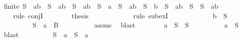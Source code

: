 \begin{isabellebody}
\ {\isachardoublequoteopen}finite\ {\isacharparenleft}S\ {\isacharminus}\ {\isacharbraceleft}a{\isacharcomma}b{\isacharbraceright}{\isacharparenright}\ {\isasymand}\ {\isacharparenleft}S\ {\isacharequal}\ {\isacharbraceleft}a{\isacharcomma}b{\isacharbraceright}\ {\isasymunion}\ {\isacharparenleft}S\ {\isacharminus}\ {\isacharbraceleft}a{\isacharcomma}b{\isacharbraceright}{\isacharparenright}\ {\isasymor}\ S\ {\isacharequal}\ {\isacharbraceleft}a{\isacharbraceright}\ {\isasymunion}\ {\isacharparenleft}S\ {\isacharminus}\ {\isacharbraceleft}a{\isacharcomma}b{\isacharbraceright}{\isacharparenright}\ {\isasymor}\ S\ {\isacharequal}\ {\isacharbraceleft}b{\isacharbraceright}\ {\isasymunion}\ {\isacharparenleft}S\ {\isacharminus}\ {\isacharbraceleft}a{\isacharcomma}b{\isacharbraceright}{\isacharparenright}\ {\isasymor}\ S\ {\isacharequal}\ {\isacharparenleft}S\ {\isacharminus}\ {\isacharbraceleft}a{\isacharcomma}b{\isacharbraceright}{\isacharparenright}{\isacharparenright}{\isachardoublequoteclose}\isanewline
\ \ \ \ \ \ \ \ \isamarkupfalse%
\ {}\ \isamarkupfalse%
\ {\isacharparenleft}rule\ conjI{\isacharparenright}\isanewline
\ \ \ \ \ \ \isamarkupfalse%
\ {\isacharquery}thesis\isanewline
\ \ \ \ \ \ \ \ \isamarkupfalse%
\ {}\ \isamarkupfalse%
\ {\isacharparenleft}rule\ subexI{\isacharparenright}\isanewline
\ \ \ \ \isamarkupfalse%
\isanewline
\ \ \ \ \ \ \isamarkupfalse%
\ {\isachardoublequoteopen}b\ {\isasymnotin}\ S{\isachardoublequoteclose}\isanewline
\ \ \ \ \ \ \isamarkupfalse%
\ \isamarkupfalse%
\ {}{\isacharcolon}{\isachardoublequoteopen}S\ {\isacharminus}\ {\isacharbraceleft}a{\isacharbraceright}\ {\isasymsubseteq}\ B{\isachardoublequoteclose}\isanewline
\ \ \ \ \ \ \ \ \isamarkupfalse%
\ assms{\isacharparenleft}{}{\isacharparenright}\ \isamarkupfalse%
\ blast\isanewline
\ \ \ \ \ \ \isamarkupfalse%
\ {\isachardoublequoteopen}{\isacharbraceleft}a{\isacharbraceright}\ {\isasymunion}\ S\ {\isacharequal}\ S{\isachardoublequoteclose}\isanewline
\ \ \ \ \ \ \ \ \isamarkupfalse%
\ {\isacartoucheopen}a\ {\isasymin}\ S{\isacartoucheclose}\ \isamarkupfalse%
\ blast\isanewline
\ \ \ \ \ \ \isamarkupfalse%
\ \isamarkupfalse%
\ {\isachardoublequoteopen}S\ {\isacharequal}\ {\isacharbraceleft}a{\isacharbraceright}\ {\isasymunion}\ {\isacharparenleft}S\ {\isacharminus}\ {\isacharbraceleft}a{\isacharbraceright}{\isacharparenright}{\isachardoublequoteclose}\ \isanewline

\end{isabellebody}
